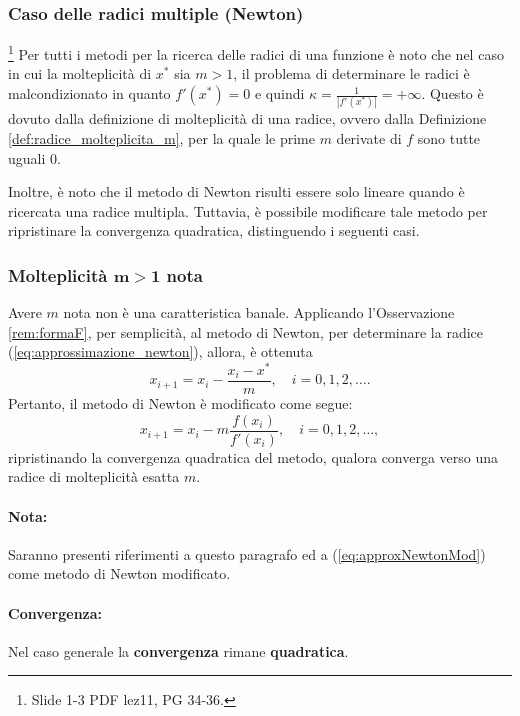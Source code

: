 \subsubsection{Caso delle radici multiple (Newton)}
\footnote{Slide 1-3 PDF lez11, PG 34-36.}
Per tutti i metodi per la ricerca delle radici di una funzione è noto che nel caso in cui la molteplicità di $x^*$ sia $m>1$, il problema di determinare le radici è malcondizionato in quanto $f'(x^*) = 0$ e quindi $\kappa = \frac{1}{|f'(x^*)|}=+\infty$. Questo è dovuto dalla definizione di molteplicità di una radice, ovvero dalla Definizione \ref{def:radice_molteplicita_m}, per la quale le prime $m$ derivate di $f$ sono tutte uguali 0.

Inoltre, è noto che il metodo di Newton risulti essere solo lineare quando è ricercata una radice multipla. Tuttavia, è possibile modificare tale metodo per ripristinare la convergenza quadratica, distinguendo i seguenti casi.

\subsubsection{Molteplicità \texorpdfstring{$\boldsymbol{m>1}$}{m>1} nota}
Avere $m$ nota non è una caratteristica banale. Applicando l'Osservazione \ref{rem:formaF}, per semplicità, al metodo di Newton, per determinare la radice (\ref{eq:approssimazione_newton}), allora, è ottenuta
\begin{equation*}
	x_{i+1}=x_i-\frac{x_i-x^*}{m}, \quad i=0,1,2,\hdots.
\end{equation*}
Pertanto, il metodo di Newton è modificato come segue:
\begin{equation}\label{eq:approxNewtonMod}
	x_{i+1}=x_i-m\frac{f(x_i)}{f'(x_i)}, \quad i=0,1,2,\hdots,
\end{equation}
ripristinando la convergenza quadratica del metodo, qualora converga verso una radice di molteplicità esatta $m$.

\paragraph{Nota:} Saranno presenti riferimenti a questo paragrafo ed a (\ref{eq:approxNewtonMod}) come metodo di Newton modificato.

\paragraph{Convergenza:} Nel caso generale la \textbf{convergenza} rimane \textbf{quadratica}.

